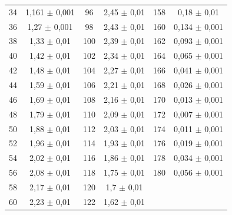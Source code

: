 \begin{table}[H]
\begin{tabular}{cc|cc|cc}
    34 & 1,161 $\pm$  0,001 & 96  & 2,45 $\pm$  0,01 & 158 & 0,18  $\pm$ 0,01 \\
    36 & 1,27  $\pm$  0,001 & 98  & 2,43 $\pm$  0,01 & 160 & 0,134 $\pm$ 0,001 \\
    38 & 1,33  $\pm$  0,01  & 100 & 2,39 $\pm$  0,01 & 162 & 0,093 $\pm$ 0,001 \\
    40 & 1,42  $\pm$  0,01  & 102 & 2,34 $\pm$  0,01 & 164 & 0,065 $\pm$ 0,001 \\
    42 & 1,48  $\pm$  0,01  & 104 & 2,27 $\pm$  0,01 & 166 & 0,041 $\pm$ 0,001 \\
    44 & 1,59  $\pm$  0,01  & 106 & 2,21 $\pm$  0,01 & 168 & 0,026 $\pm$ 0,001 \\
    46 & 1,69  $\pm$  0,01  & 108 & 2,16 $\pm$  0,01 & 170 & 0,013 $\pm$ 0,001 \\
    48 & 1,79  $\pm$  0,01  & 110 & 2,09 $\pm$  0,01 & 172 & 0,007 $\pm$ 0,001 \\
    50 & 1,88  $\pm$  0,01  & 112 & 2,03 $\pm$  0,01 & 174 & 0,011 $\pm$ 0,001 \\
    52 & 1,96  $\pm$  0,01  & 114 & 1,93 $\pm$  0,01 & 176 & 0,019 $\pm$ 0,001 \\
    54 & 2,02  $\pm$  0,01  & 116 & 1,86 $\pm$  0,01 & 178 & 0,034 $\pm$ 0,001 \\
    56 & 2,08  $\pm$  0,01  & 118 & 1,75 $\pm$  0,01 & 180 & 0,056 $\pm$ 0,001 \\
    58 & 2,17  $\pm$  0,01  & 120 & 1,7  $\pm$  0,01 &  &  \\
    60 & 2,23  $\pm$  0,01  & 122 & 1,62 $\pm$  0,01 &  &  \\
    \bottomrule 
    \end{tabular}
    \label{tab:pol}
\end{table}



